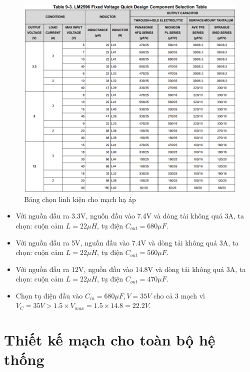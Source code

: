                 \begin{figure}[H]
                    \centering
                    \includegraphics[width=1\textwidth]{pictures/chapter4/c4_p17_ChooseComponent.png}
                    \caption{Bảng chọn linh kiện cho mạch hạ áp}
                    \label{fig:4-10}
                \end{figure}
                \begin{itemize}
                    \item Với nguồn đầu ra 3.3V, nguồn đầu vào 7.4V và dòng tải không quá 3A, ta chọn: cuộn cảm $L = 22 \mu H$, tụ điện $C_{out} = 680 \mu F$. 
                    \item Với nguồn đầu ra 5V, nguồn đầu vào 7.4V và dòng tải không quá 3A, ta chọn: cuộn cảm $L = 22 \mu H$, tụ điện $C_{out} = 560 \mu F$.
                    \item Với nguồn đầu ra 12V, nguồn đầu vào 14.8V và dòng tải không quá 3A, ta chọn: cuộn cảm $L = 22 \mu H$, tụ điện $C_{out} = 470 \mu F$.
                    \item Chọn tụ điện đầu vào $C_{in} = 680 \mu F, V = 35 V$ cho cả 3 mạch vì $V_{C} = 35 V > 1.5 \times V_{max} = 1.5 \times 14.8 = 22.2 V$.
                \end{itemize}
        \section{Thiết kế mạch cho toàn bộ hệ thống}
